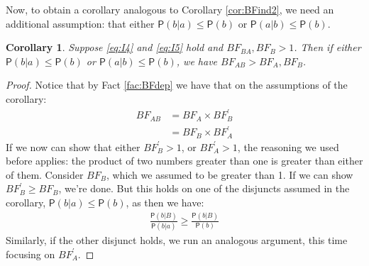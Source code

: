 \documentclass[
  10pt,
  dvipsnames,enabledeprecatedfontcommands]{scrartcl}
\newcommand{\pr}[1]{\ensuremath{\mathsf{P}(#1)}}
\newtheorem{corollary}{Corollary}[fact]
\begin{document}
Now, to obtain a corollary analogous to Corollary \ref{cor:BFind2}, we
need an additional assumption: that either \(\pr{b\vert a} \leq \pr{b}\)
or \(\pr{a \vert b} \leq \pr{b}\).

\begin{corollary} Suppose \eqref{eq:I4} and \eqref{eq:I5}  hold and $BF_{BA}, BF_{B} >1$. 
Then if either $\pr{b\vert a} \leq \pr{b}$ or \linebreak  $\pr{a \vert b} \leq \pr{b}$, we have $BF_{AB}> BF_{A}, BF_{B}$.
\end{corollary}

\begin{proof}
Notice that by Fact \ref{fac:BFdep} we have that on the assumptions of the corollary:
\begin{align*}
BF_{AB} & = BF_{A}\times BF^{'}_{B} \\
& = BF_{B} \times BF^{'}_{A}
\end{align*}
If we now can show that either $BF^{'}_{B} > 1$, or $BF^{'}_{A} > 1$, the reasoning we used before applies: the product of two numbers greater than one is greater than either of them.  Consider $BF_{B}$, which we assumed to be greater than 1. If we can show $BF^{'}_{B}\geq BF_{B}$, we're done. But this holds on one of the disjuncts assumed in the corollary, $\pr{b\vert a} \leq \pr{b}$, as then we have:
\begin{align*}
\frac{\pr{b \vert B}}{\pr{b\vert a}} \geq \frac{\pr{b \vert B}}{\pr{b}}
\end{align*}
Similarly, if the other disjunct holds, we run an analogous argument, this time focusing on $BF^{'}_{A}$.
\end{proof}
\end{document}
